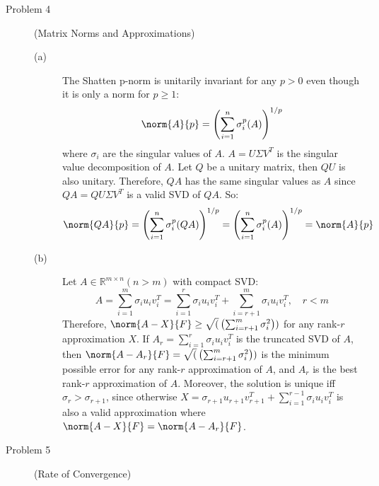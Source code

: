 \documentclass[11pt]{article}
\begin{document}
\begin{description}
\begin{description}
\end{description}

\item[Problem 4]  (Matrix Norms and Approximations)

\begin{description}
    \item[(a)]
    The Shatten p-norm is unitarily invariant for any $p > 0$ even though it is only a norm for $p \geq 1$:
    \begin{equation*}
        \norm{A}{p} = \left( \sum_{i=1}^{n} \sigma_i^p (A) \right)^{1/p}
    \end{equation*}
    where $\sigma_i$ are the singular values of $A$. $A=U\Sigma V^T$ is the singular value decomposition of $A$.
    Let $Q$ be a unitary matrix, then $QU$ is also unitary. Therefore, $QA$ has the same singular values as $A$
    since $QA=QU\Sigma V^T$ is a valid SVD of $QA$. So:
    \begin{equation*}
        \norm{QA}{p} = \left( \sum_{i=1}^{n} \sigma_i^p (QA) \right)^{1/p} = \left( \sum_{i=1}^{n} \sigma_i^p (A) \right)^{1/p} = \norm{A}{p}
    \end{equation*}

    \item[(b)] 
    Let $A \in \mathbb{R}^{m \times n} (n>m)$ with compact SVD:
    \begin{equation*}
        A=\sum_{i=1}^{m}\sigma_iu_iv_i^T=\sum_{i=1}^{r}\sigma_iu_iv_i^T + \sum_{i=r+1}^{m}\sigma_iu_iv_i^T, \quad r < m
    \end{equation*}
    Therefore, $\norm{A-X}{F} \geq \sqrt(\left(\sum_{i=r+1}^{m}\sigma_i^2\right))$ for any rank-$r$ approximation $X$.
    If $A_r=\sum_{i=1}^{r}\sigma_iu_iv_i^T$ is the truncated SVD of $A$, then $\norm{A-A_r}{F}=\sqrt(\left(\sum_{i=r+1}^{m}\sigma_i^2\right))$
    is the minimum possible error for any rank-$r$ approximation of $A$, and $A_r$ is the best rank-$r$ approximation of $A$.
    Moreover, the solution is unique iff $\sigma_r > \sigma_{r+1}$, since otherwise $X=\sigma_{r+1}u_{r+1}v_{r+1}^T+\sum_{i=1}^{r-1}\sigma_iu_iv_i^T$
    is also a valid approximation where $\norm{A-X}{F}=\norm{A-A_r}{F}$.
        
\end{description}

\item[Problem 5]  (Rate of Convergence)


\end{description}
\end{document}
